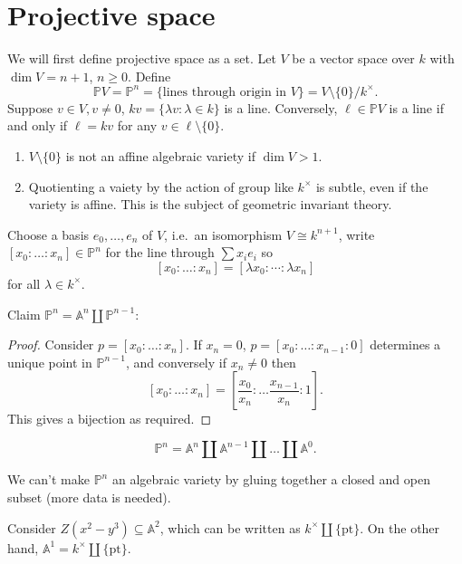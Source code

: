 \documentclass[a4paper]{article}
\renewcommand{\A}{\mathbb{A}}
\renewcommand*{\P}{\mathbb{P}}
\begin{document}
\section{Projective space}

We will first define projective space as a set. Let \(V\) be a vector space over \(k\) with \(\dim V = n + 1\), \(n \geq 0\). Define
\[
  \P V = \P^n = \{\text{lines through origin in } V\} = V \setminus \{0\}/k^\times.
\]
Suppose \(v \in V, v \neq 0\), \(kv = \{\lambda v: \lambda \in k\}\) is a line. Conversely, \(\ell \in \P V\) is a line if and only if \(\ell = kv\) for any \(v \in \ell \setminus \{0\}\).

\begin{note}\leavevmode
  \begin{enumerate}
  \item \(V \setminus \{0\}\) is not an affine algebraic variety if \(\dim V > 1\).
  \item Quotienting a vaiety by the action of group like \(k^\times\) is subtle, even if the variety is affine. This is the subject of geometric invariant theory.
  \end{enumerate}
\end{note}

Choose a basis \(e_0, \dots, e_n\) of \(V\), i.e.\ an isomorphism \(V \cong k^{n + 1}\), write \([x_0 : \dots : x_n] \in \P^n\) for the line through \(\sum x_i e_i\) so
\[
  [x_0: \dots : x_n] = [\lambda x_0 : \cdots : \lambda x_n]
\]
for all \(\lambda \in k^\times\).

Claim \(\P^n = \A^n \amalg \P^{n - 1}\):

\begin{proof}
  Consider \(p = [x_0 : \dots : x_n]\). If \(x_n = 0\), \(p = [x_0 : \dots : x_{n - 1} : 0]\) determines a unique point in \(\P^{n - 1}\), and conversely if \(x_n \neq 0\) then
  \[
    [x_0 : \dots : x_n] = [\frac{x_0}{x_n} : \dots \frac{x_{n - 1}}{x_n} : 1].
  \]
  This gives a bijection as required.
\end{proof}

\begin{corollary}
  \[
    \P^n = \A^n \amalg \A^{n - 1} \amalg \dots \amalg \A^0.
  \]
\end{corollary}

We can't make \(\P^n\) an algebraic variety by gluing together a closed and open subset (more data is needed).

\begin{ex}
  Consider \(Z(x^2 - y^3) \subseteq \A^2\), which can be written as \(k^\times \amalg \{\text{pt}\}\). On the other hand, \(\A^1 = k^\times \amalg \{\text{pt}\}\).
\end{ex}
\end{document}
